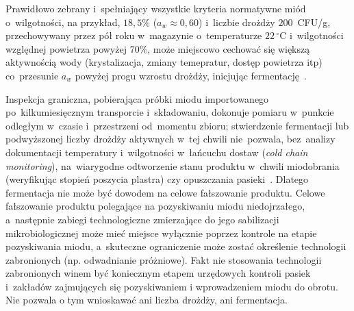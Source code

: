Prawidłowo zebrany i~spełniający wszystkie kryteria normatywne
miód o~wilgotności, na przykład, $18{,}5\%$ ($a_w \approx 0{,}60$)
i~liczbie drożdży $200$~CFU/g, przechowywany przez pół roku
w~magazynie o~temperaturze $22\,^\circ$C i~wilgotności względnej
powietrza powyżej 70\%, może  miejscowo cechować się  większą aktywnością wody (krystalizacja, zmiany temepratur, dostęp powietrza itp) co~przesunie $a_w$ powyżej progu wzrostu drożdży, inicjując
fermentację~\cite{apinz2021}. 

Inspekcja graniczna, pobierająca próbki miodu importowanego
po~kilkumiesięcznym transporcie i~składowaniu, dokonuje
pomiaru w~punkcie odległym w~czasie i~przestrzeni od~momentu
zbioru; stwierdzenie fermentacji lub podwyższonej liczby
drożdży aktywnych w~tej chwili nie~pozwala, bez~analizy
dokumentacji temperatury i~wilgotności w~łańcuchu dostaw
(\textit{cold chain monitoring}), na~wiarygodne odtworzenie
stanu produktu w~chwili miodobrania (weryfikując stopień poszycia plastra) czy opuszczania pasieki~\cite{tsagkaris2021,schoder2026}.
Dlatego fermentacja nie może być dowodem na celowe fałszowanie produktu. Celowe fałszowanie produktu polegające na pozyskiwaniu miodu niedojrzałego, a~następnie zabiegi technologiczne zmierzające do jego sabilizacji mikrobiologicznej może mieć miejsce wyłącznie poprzez kontrole na etapie pozyskiwania miodu, a~skuteczne ograniczenie może zostać określenie technologii zabronionych (np. odwadnianie próżniowe). Fakt nie stosowania technologii zabronionych winem być koniecznym etapem urzędowych kontroli pasiek i~zakładów zajmujących się pozyskiwaniem i wprowadzeniem miodu do obrotu. Nie pozwala o tym wnioskawać ani liczba drożdży, ani fermentacja.  

